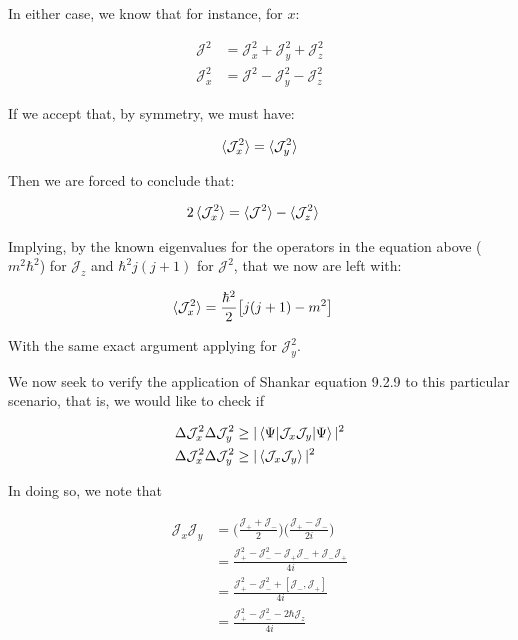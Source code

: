 \documentclass[paper=a4, fontsize=11pt]{scrartcl} %
\numberwithin{equation}{section} %
\numberwithin{figure}{section} %
\numberwithin{table}{section} %
\begin{document}
In either case, we know that for instance, for $x$:

\begin{align}
\mathcal{J}^2 &= \mathcal{J}_x^2 + \mathcal{J}_y^2 + \mathcal{J}_z^2 \\
\mathcal{J}_x^2 &= \mathcal{J}^2 - \mathcal{J}_y^2 - \mathcal{J}_z^2
\end{align}

If we accept that, by symmetry, we must have:

\begin{equation}
\braket{\mathcal{J}_x^2} = \braket{\mathcal{J}_y^2}
\end{equation}

Then we are forced to conclude that:

\begin{align}
2\braket{\mathcal{J}_x^2} &= \braket{\mathcal{J}^2} - \braket{\mathcal{J}_z^2}
\end{align}

Implying, by the known eigenvalues for the operators in the equation above ($m^2 \hbar^2$) for $\mathcal{J}_z$ and $\hbar^2 j(j+1)$ for $\mathcal{J}^2$, that we now are left with:

\begin{align}
\braket{\mathcal{J}_x^2} &= \frac{\hbar^2}{2} \big[ j(j+1) - m^2 \big]
\end{align}

With the same exact argument applying for $\mathcal{J}_y^2$.

We now seek to verify the application of Shankar equation 9.2.9 to this particular scenario, that is, we would like to check if 

\begin{align}
\Delta \mathcal{J}_x^2 \Delta \mathcal{J}_y^2 &\geq |\braket{\Psi|\mathcal{J}_x \mathcal{J}_y|\Psi}|^2 \\
\Delta \mathcal{J}_x^2 \Delta \mathcal{J}_y^2 &\geq |\braket{\mathcal{J}_x \mathcal{J}_y}|^2 
\end{align}

In doing so, we note that 

\begin{align}
\mathcal{J}_x \mathcal{J}_y &= \bigg(\frac{\mathcal{J}_+ + \mathcal{J}_-}{2}\bigg) \bigg(\frac{\mathcal{J}_+ - \mathcal{J}_-}{2i}\bigg) \\ 
&= \frac{\mathcal{J}_+^2 - \mathcal{J}_-^2 - \mathcal{J}_+ \mathcal{J}_- + \mathcal{J}_- \mathcal{J}_+}{4i} \\
&= \frac{\mathcal{J}_+^2 - \mathcal{J}_-^2 + [\mathcal{J}_- , \mathcal{J}_+]}{4i} \\
&= \frac{\mathcal{J}_+^2 - \mathcal{J}_-^2 -2 \hbar \mathcal{J}_z }{4i}
\end{align}
\end{document}
